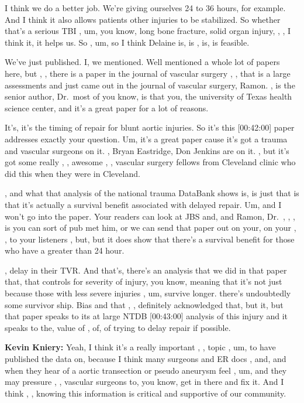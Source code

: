 \documentclass[
]{book}
\begin{document}
I think we do a better job. We're giving ourselves 24 to 36 hours, for
example. And I think it also allows patients other injuries to be
stabilized. So whether that's a serious TBI , um, you know, long bone
fracture, solid organ injury, , , I think it, it helps us. So , um, so I
think Delaine is, is , is, is feasible.

We've just published. I, we mentioned. Well mentioned a whole lot of
papers here, but , , there is a paper in the journal of vascular surgery
, , that is a large assessments and just came out in the journal of
vascular surgery, Ramon. , is the senior author, Dr.~most of you know,
is that you, the university of Texas health science center, and it's a
great paper for a lot of reasons.

It's, it's the timing of repair for blunt aortic injuries. So it's this
{[}00:42:00{]} paper addresses exactly your question. Um, it's a great paper
cause it's got a trauma and vascular surgeons on it. , Bryan Eastridge,
Don Jenkins are on it. , but it's got some really , , awesome , ,
vascular surgery fellows from Cleveland clinic who did this when they
were in Cleveland.

, and what that analysis of the national trauma DataBank shows is, is
just that is that it's actually a survival benefit associated with
delayed repair. Um, and I won't go into the paper. Your readers can look
at JBS and, and Ramon, Dr.~, , , is you can sort of pub met him, or we
can send that paper out on your, on your , , to your listeners , but,
but it does show that there's a survival benefit for those who have a
greater than 24 hour.

, delay in their TVR. And that's, there's an analysis that we did in
that paper that, that controls for severity of injury, you know, meaning
that it's not just because those with less severe injuries , um, survive
longer. there's undoubtedly some survivor ship. Bias and that , ,
definitely acknowledged that, but it, but that paper speaks to its at
large NTDB {[}00:43:00{]} analysis of this injury and it speaks to the,
value of , of, of trying to delay repair if possible.

\textbf{Kevin Kniery:} Yeah, I think it's a really important , , topic , um,
to have published the data on, because I think many surgeons and ER docs
, and, and when they hear of a aortic transection or pseudo aneurysm
feel , um, and they may pressure , , vascular surgeons to, you know, get
in there and fix it. And I think , , knowing this information is
critical and supportive of our community.
\end{document}
